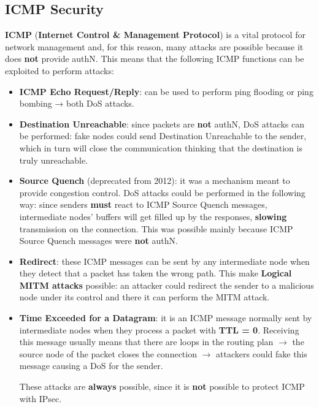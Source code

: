 \subsection{ICMP Security}
\textbf{ICMP} (\textbf{Internet Control \& Management Protocol}) is a vital protocol for network management and, for this reason, many attacks are possible because it does \textbf{not} provide authN.
This means that the following ICMP functions can be exploited to perform attacks:
\begin{itemize}
    \item \textbf{ICMP Echo Request/Reply}: can be used to perform ping flooding or ping bombing → both DoS attacks.
    \item \textbf{Destination Unreachable}: since packets are \textbf{not} authN, DoS attacks can be performed:
    fake nodes could send Destination Unreachable to the sender, which in turn will close the communication thinking that the destination is truly unreachable.
    \item \textbf{Source Quench} (deprecated from 2012): it was a mechanism meant to provide congestion control. DoS attacks could be performed in the following way: since senders \textbf{must}
    react to ICMP Source Quench messages, intermediate nodes’ buffers will get filled up by
    the responses, \textbf{slowing} transmission on the connection. This was possible mainly because
    ICMP Source Quench messages were \textbf{not} authN.
    \item \textbf{Redirect}: these ICMP messages can be sent by any intermediate node when they detect
    that a packet has taken the wrong path. This make \textbf{Logical MITM attacks} possible: an attacker could redirect the sender to a malicious node under its control and there it can perform the MITM attack.
    \item \textbf{Time Exceeded for a Datagram}: it is an ICMP message normally sent by intermediate
    nodes when they process a packet with \textbf{TTL = 0}. Receiving this message usually means
    that there are loops in the routing plan \(\rightarrow \) the source node of the packet closes the
    connection \(\rightarrow \) attackers could fake this message causing a DoS for the sender.
    \begin{quotebox-yellow}{}
        These attacks are \textbf{always} possible, since it is \textbf{not} possible to protect ICMP with IPsec.
    \end{quotebox-yellow}
\end{itemize}
